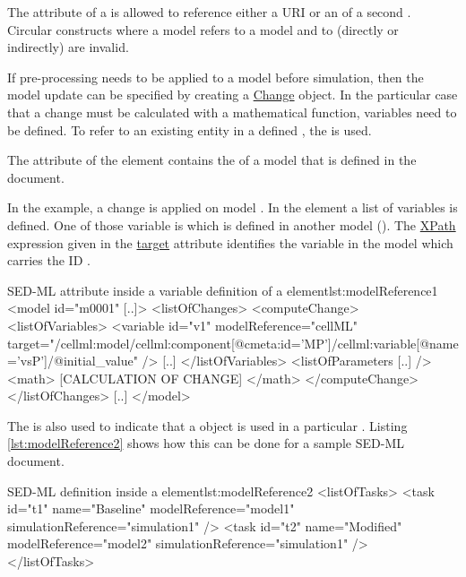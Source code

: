 The \hyperref[sec:model_source]{} attribute of a \Model is allowed to reference either a URI or an \SId of a second \Model. Circular constructs where a model  refers to a model  and  to  (directly or indirectly) are invalid.

If pre-processing needs to be applied to a model before simulation, then the model update can be specified by creating a \hyperref[class:change]{Change} object. In the particular case that a change must be calculated with a mathematical function, variables need to be defined. To refer to an existing entity in a defined \Model, the  is used. 

The  attribute of the  element contains the  of a model that is defined in the document. 

In the example, a change is  applied on model . In the  element a list of variables is defined. One of those variable is  which is defined in another model (). The \hyperref[sec:xpath]{XPath} expression given in the \hyperref[sec:target]{target} attribute identifies the variable in the model which carries the ID .
\begin{myXmlLst}{SED-ML  attribute inside a variable definition of a  element}{lst:modelReference1}
<model id="m0001" [..]>
	<listOfChanges>
		<computeChange>
			<listOfVariables>
				<variable id="v1" modelReference="cellML" target="/cellml:model/cellml:component[@cmeta:id='MP']/cellml:variable[@name='vsP']/@initial_value" />
     			[..]
			</listOfVariables>
			<listOfParameters [..] />
    			<math>
     			[CALCULATION OF CHANGE]
    			</math>
   		</computeChange>
	</listOfChanges>
	[..]
</model>
\end{myXmlLst}

The  is also used to indicate that a \Model object is used in a particular  \Task. Listing \ref{lst:modelReference2} shows how this can be done for a sample SED-ML document.

\begin{myXmlLst}{SED-ML  definition inside a  element}{lst:modelReference2}
<listOfTasks>
	<task id="t1" name="Baseline" modelReference="model1" simulationReference="simulation1" />
	<task id="t2" name="Modified" modelReference="model2" simulationReference="simulation1" />
</listOfTasks>
\end{myXmlLst}

